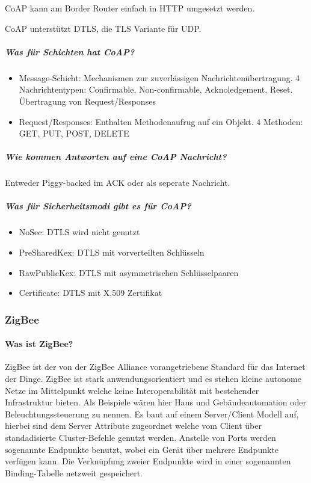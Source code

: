 	CoAP kann am Border Router einfach in HTTP umgesetzt werden.
	
	CoAP unterstützt DTLS, die TLS Variante für UDP.
	
	\subparagraph{Was für Schichten hat CoAP?}
	\begin{itemize}
		\item Message-Schicht: Mechanismen zur zuverlässigen Nachrichtenübertragung. 4 Nachrichtentypen: Confirmable, Non-confirmable, Acknoledgement, Reset. Übertragung von Request/Responses
		\item Request/Responses: Enthalten Methodenaufrug auf ein Objekt. 4 Methoden: GET, PUT, POST, DELETE
	\end{itemize}
	
	\subparagraph{Wie kommen Antworten auf eine CoAP Nachricht?}
	Entweder Piggy-backed im ACK oder als seperate Nachricht.
	
	\subparagraph{Was für Sicherheitsmodi gibt es für CoAP?}
	\begin{itemize}
		\item NoSec: DTLS wird nicht genutzt
		\item PreSharedKex: DTLS mit vorverteilten Schlüsseln
		\item RawPublicKex: DTLS mit asymmetrischen Schlüsselpaaren
		\item Certificate: DTLS mit X.509 Zertifikat
	\end{itemize}
	
\subsubsection{ZigBee}
	\paragraph{Was ist ZigBee?}
	ZigBee ist der von der ZigBee Alliance vorangetriebene Standard für das Internet der Dinge. ZigBee ist stark anwendungsorientiert und es stehen kleine autonome Netze im Mittelpunkt welche keine Interoperabilität mit bestehender Infrastruktur bieten.
	Als Beispiele wären hier Haus und Gebäudeautomation oder Beleuchtungssteuerung zu nennen. Es baut auf einem Server/Client Modell auf, hierbei sind dem Server Attribute zugeordnet welche vom Client über standadisierte Cluster-Befehle genutzt werden. Anstelle von Ports werden sogenannte Endpunkte benutzt, wobei ein Gerät über mehrere Endpunkte verfügen kann. Die Verknüpfung zweier Endpunkte wird in einer sogenannten Binding-Tabelle netzweit gespeichert.
	
